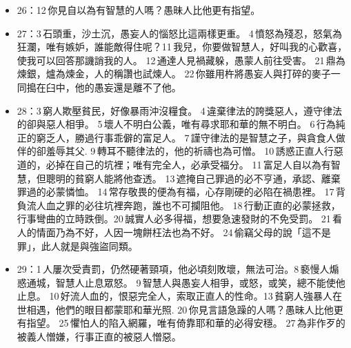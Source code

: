 \begin{itemize}
\item 26：12 你見自以為有智慧的人嗎？愚昧人比他更有指望。
\item 27：3 石頭重，沙土沉，愚妄人的惱怒比這兩樣更重。 4 憤怒為殘忍，怒氣為狂瀾，唯有嫉妒，誰能敵得住呢？11 我兒，你要做智慧人，好叫我的心歡喜，使我可以回答那譏誚我的人。 12 通達人見禍藏躲，愚蒙人前往受害。 21 鼎為煉銀，爐為煉金，人的稱讚也試煉人。 22 你雖用杵將愚妄人與打碎的麥子一同搗在臼中，他的愚妄還是離不了他。
\item 28：3 窮人欺壓貧民，好像暴雨沖沒糧食。 4 違棄律法的誇獎惡人，遵守律法的卻與惡人相爭。 5 壞人不明白公義，唯有尋求耶和華的無不明白。 6 行為純正的窮乏人，勝過行事乖僻的富足人。 7 謹守律法的是智慧之子，與貪食人做伴的卻羞辱其父. 9 轉耳不聽律法的，他的祈禱也為可憎。 10 誘惑正直人行惡道的，必掉在自己的坑裡；唯有完全人，必承受福分。 11 富足人自以為有智慧，但聰明的貧窮人能將他查透。 13 遮掩自己罪過的必不亨通，承認、離棄罪過的必蒙憐恤。 14 常存敬畏的便為有福，心存剛硬的必陷在禍患裡。 17 背負流人血之罪的必往坑裡奔跑，誰也不可攔阻他。 18 行動正直的必蒙拯救，行事彎曲的立時跌倒。20 誠實人必多得福，想要急速發財的不免受罰。 21 看人的情面乃為不好，人因一塊餅枉法也為不好。 24 偷竊父母的說「這不是罪」，此人就是與強盜同類。
\item 29：1 人屢次受責罰，仍然硬著頸項，他必頃刻敗壞，無法可治。8 褻慢人煽惑通城，智慧人止息眾怒。 9 智慧人與愚妄人相爭，或怒，或笑，總不能使他止息。 10 好流人血的，恨惡完全人，索取正直人的性命。13 貧窮人強暴人在世相遇，他們的眼目都蒙耶和華光照. 20 你見言語急躁的人嗎？愚昧人比他更有指望。 25 懼怕人的陷入網羅，唯有倚靠耶和華的必得安穩。 27 為非作歹的被義人憎嫌，行事正直的被惡人憎惡。
\end{itemize}
